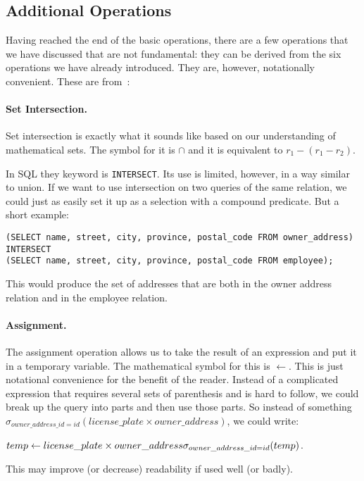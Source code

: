 \subsection*{Additional Operations}
Having reached the end of the basic operations, there are a few operations that we have discussed that are not fundamental: they can be derived from the six operations we have already introduced. They are, however, notationally convenient. These are from~\cite{dsc}:

\paragraph{Set Intersection.} Set intersection is exactly what it sounds like based on our understanding of mathematical sets. The symbol for it is $\cap$ and it is equivalent to $r_{1} - (r_{1} - r_{2})$.

In SQL they keyword is \texttt{INTERSECT}. Its use is limited, however, in a way similar to union. If we want to use intersection on two queries of the same relation, we could just as easily set it up as a selection with a compound predicate. But a short example:

\texttt{(SELECT name, street, city, province, postal\_code FROM owner\_address)\\ 
INTERSECT\\ 
(SELECT name, street, city, province, postal\_code FROM employee);}

This would produce the set of addresses that are both in the owner address relation and in the employee relation.

\paragraph{Assignment.} The assignment operation allows us to take the result of an expression and put it in a temporary variable. The mathematical symbol for this is $\leftarrow$. This is just notational convenience for the benefit of the reader. Instead of a complicated expression that requires several sets of parenthesis and is hard to follow, we could break up the query into parts and then use those parts. So instead of something $\sigma_{owner\_address\_id = id}( license\_plate \times owner\_address )$, we could write: 

$temp \leftarrow license\_plate \times owner\_address\\
\sigma_{owner\_address\_id = id}( temp ) $.

This may improve (or decrease) readability if used well (or badly).

